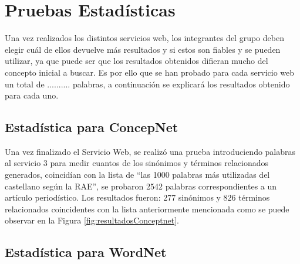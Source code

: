 \section{Pruebas Estadísticas}
Una vez realizados los distintos servicios web, los integrantes del grupo deben elegir cuál de ellos devuelve más resultados y si estos son fiables y se pueden utilizar, ya que puede ser que los resultados obtenidos difieran mucho del concepto inicial a buscar.
Es por ello que se han probado para cada servicio web un total de .......... palabras, a continuación se explicará los resultados obtenido para cada uno.

\subsection{Estadística para ConcepNet}
\label{cap:subsec:pruebaConceptnet}

Una vez finalizado el Servicio Web, se realizó una prueba introduciendo palabras al servicio 3 para medir cuantos de los sinónimos y términos relacionados generados, coincidían con la lista de ``las 1000 palabras más utilizadas del castellano según la RAE'', se probaron 2542 palabras correspondientes a un artículo periodístico. Los resultados fueron: 277 sinónimos y 826 términos relacionados coincidentes con la lista anteriormente mencionada como se puede observar en la Figura \ref{fig:resultadosConceptnet}.





\subsection{Estadística para WordNet}